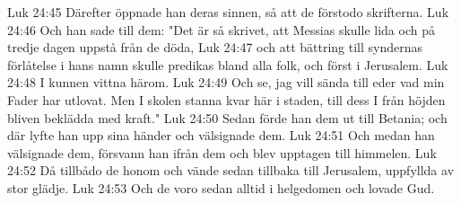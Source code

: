 Luk 24:45  Därefter öppnade han deras sinnen, så att de förstodo skrifterna.
Luk 24:46  Och han sade till dem: "Det är så skrivet, att Messias skulle lida och på tredje dagen uppstå från de döda,
Luk 24:47  och att bättring till syndernas förlåtelse i hans namn skulle predikas bland alla folk, och först i Jerusalem.
Luk 24:48  I kunnen vittna härom.
Luk 24:49  Och se, jag vill sända till eder vad min Fader har utlovat. Men I skolen stanna kvar här i staden, till dess I från höjden bliven beklädda med kraft."
Luk 24:50  Sedan förde han dem ut till Betania; och där lyfte han upp sina händer och välsignade dem.
Luk 24:51  Och medan han välsignade dem, försvann han ifrån dem och blev upptagen till himmelen.
Luk 24:52  Då tillbådo de honom och vände sedan tillbaka till Jerusalem, uppfyllda av stor glädje.
Luk 24:53  Och de voro sedan alltid i helgedomen och lovade Gud.


